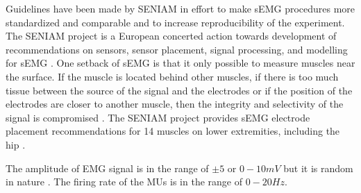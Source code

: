 Guidelines have been made by \ac{SENIAM} in effort to make \ac{sEMG} procedures more standardized and comparable and to increase reproducibility of the experiment. 
The \ac{SENIAM} project is a European concerted action towards development of recommendations on sensors, sensor placement, signal processing, and modelling for \ac{sEMG} \cite{Hermens1999, Hermens2000}.
One setback of \ac{sEMG} is that it only possible to measure muscles near the surface.
If the muscle is located behind other muscles, if there is too much tissue between the source of the signal and the electrodes or if the position of the electrodes are closer to another muscle, then the integrity and selectivity of the signal is compromised \cite{Farina2016, Hermens2000}.
The \ac{SENIAM} project provides \ac{sEMG} electrode placement recommendations for 14 muscles on lower extremities, including the hip \cite{Hermens1999}.

The amplitude of \ac{EMG} signal is in the range of $\pm 5$ or $0-10 mV$ but it is random in nature \cite{Raez2006}.
The firing rate of the \acp{MU} is in the range of $0-20Hz$.

